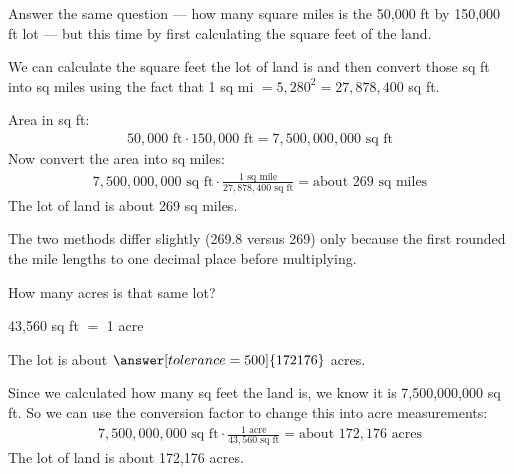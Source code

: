 \documentclass[12pt]{ximera}
\begin{document}
\begin{problem}
Answer the same question --- how many square miles is the 50,000 ft by 150,000 ft lot
--- but this time by first calculating the square feet of the land.

\begin{freeResponse}
\end{freeResponse}

\begin{solution}
We can calculate the square feet the lot of land is and then convert those sq ft into
sq miles using the fact that 1 sq mi $= 5{,}280^{2} = 27{,}878{,}400$ sq ft.

Area in sq ft:
\begin{gather*}
50{,}000\text{ ft} \cdot 150{,}000\text{ ft} = 7{,}500{,}000{,}000\text{ sq ft}
\end{gather*}
Now convert the area into sq miles:
\begin{gather*}
7{,}500{,}000{,}000\text{ sq ft} \cdot \frac{1\text{ sq mile}}{27{,}878{,}400\text{ sq ft}} = \text{about } 269\text{ sq miles}
\end{gather*}
The lot of land is about 269 sq miles.

The two methods differ slightly (269.8 versus 269) only because the first rounded the
mile lengths to one decimal place before multiplying.
\end{solution}
\end{problem}

\begin{problem}
How many acres is that same lot?

\hspace{1em} 43,560 sq ft $=$ 1 acre

The lot is about $\answer[tolerance=500]{172176}$ acres.

\begin{solution}
Since we calculated how many sq feet the land is, we know it is 7,500,000,000 sq ft. So
we can use the conversion factor to change this into acre measurements:
\begin{gather*}
7{,}500{,}000{,}000\text{ sq ft} \cdot \frac{1\text{ acre}}{43{,}560\text{ sq ft}} = \text{about } 172{,}176\text{ acres}
\end{gather*}
The lot of land is about 172,176 acres.
\end{solution}
\end{problem}
\end{document}
